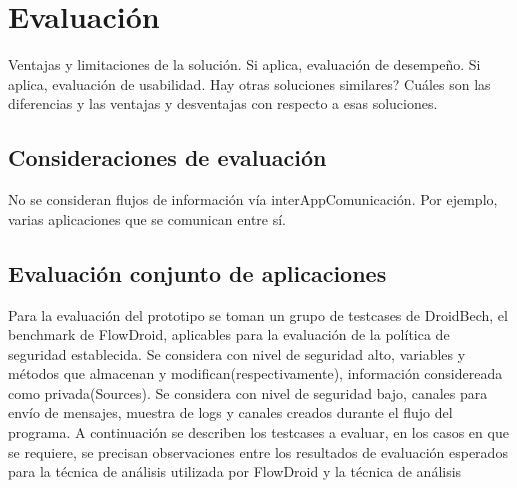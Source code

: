 \label{ch:evaluacion}
\chapter{Evaluación}
Ventajas y limitaciones de la solución.\newline 
Si aplica, evaluación de desempeño.  \newline 
Si aplica, evaluación de usabilidad.  
Hay otras soluciones similares? \newline 
Cuáles son las diferencias y las ventajas y desventajas con respecto a esas soluciones.

\section{Consideraciones de evaluación}
No se consideran flujos de información vía interAppComunicación. Por ejemplo,
varias aplicaciones que se comunican entre sí.

\section{Evaluación conjunto de aplicaciones}
Para la evaluación del prototipo se toman un grupo de testcases de DroidBech, el
benchmark de FlowDroid, aplicables para la evaluación de la política de
seguridad establecida.\newline 
Se considera con nivel de seguridad alto, variables y métodos que almacenan y
modifican(respectivamente), información considereada como privada(Sources).\newline 
Se considera con nivel de seguridad bajo, canales para envío de mensajes,
muestra de logs y canales creados durante el flujo del programa.\newline
A continuación se describen los testcases a evaluar, en los casos en que se
requiere, se precisan observaciones entre los resultados de evaluación esperados
para la técnica de análisis utilizada por FlowDroid y la técnica de análisis

